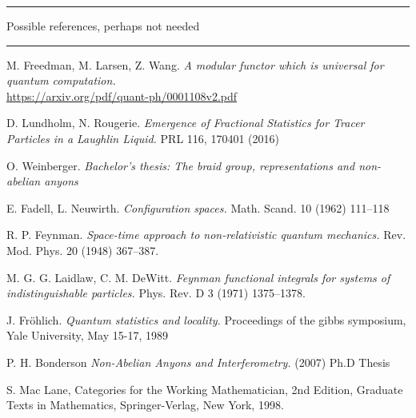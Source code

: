 \documentclass[a4paper,10pt,oneside]{book}
\theoremstyle{plain}
\theoremstyle{definition}
\theoremstyle{remark}
\begin{document}
\begin{thebibliography}{99}
  \vspace{1cm}
  \hrule
  Possible references, perhaps not needed
  \hrule

  \bibitem{}
    M. Freedman, M. Larsen, Z. Wang.
    \textit{A modular functor which is universal for quantum computation.}
    \\
    \url{https://arxiv.org/pdf/quant-ph/0001108v2.pdf}

    D. Lundholm, N. Rougerie.
    \textit{Emergence of Fractional Statistics for Tracer Particles in a Laughlin Liquid.}
    PRL 116, 170401 (2016)

    O. Weinberger.
    \textit{Bachelor's thesis: The braid group, representations and non-abelian anyons}

    E. Fadell, L. Neuwirth.
    \textit{Configuration spaces.}
    Math. Scand. 10 (1962) 111–118

    R. P. Feynman.
    \textit{Space-time approach to non-relativistic quantum mechanics.}
    Rev. Mod. Phys. 20 (1948) 367–387.

    M. G. G. Laidlaw, C. M. DeWitt.
    \textit{Feynman functional integrals for systems of indistinguishable particles.}
    Phys. Rev. D 3 (1971) 1375–1378.

    J. Fröhlich.
    \textit{Quantum statistics and locality.}
    Proceedings of the gibbs symposium,
    Yale University, May 15-17, 1989

    P. H. Bonderson
    \textit{Non-Abelian Anyons and Interferometry.}
    (2007) Ph.D Thesis

    S. Mac Lane, Categories for the Working Mathematician, 2nd Edition, Graduate Texts in Mathematics, Springer-Verlag, New York, 1998.

\end{thebibliography}
\end{document}
